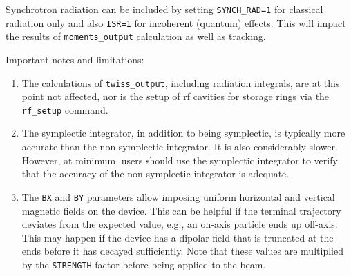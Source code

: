 Synchrotron radiation can be included by setting \verb|SYNCH_RAD=1| for classical radiation only and
also \verb|ISR=1| for incoherent (quantum) effects. 
This will impact the results of \verb|moments_output| calculation as well as tracking.

Important notes and limitations:
\begin{enumerate}
\item The calculations of \verb|twiss_output|, including radiation integrals, are at this point not affected,
nor is the setup of rf cavities for storage rings via the \verb|rf_setup| command.
\item The symplectic integrator, in addition to being symplectic, is typically more accurate than the non-symplectic integrator.
  It is also considerably slower.
  However, at minimum, users should use the symplectic integrator to verify that the accuracy of the non-symplectic integrator
  is adequate.
\item The \verb|BX| and \verb|BY| parameters allow imposing uniform horizontal and vertical magnetic fields 
  on the device.
  This can be helpful if the terminal trajectory deviates from the expected value, e.g., an on-axis particle  
  ends up off-axis. This may happen if the device has
  a dipolar field that is truncated at the ends before it has decayed sufficiently.
  Note that these values are multiplied by the \verb|STRENGTH| factor before being applied to the beam.
\end{enumerate}

